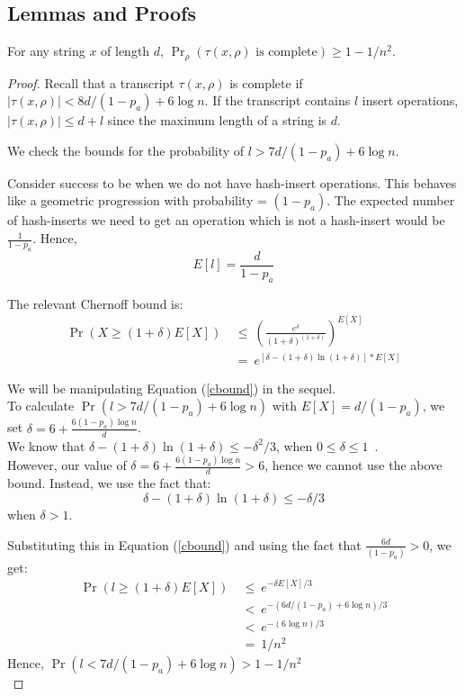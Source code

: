 \documentclass{article}
\begin{document}
\subsection*{Lemmas and Proofs}

\begin{lem}
    For any string $x$ of length $d$,
    $\Pr_\rho  (\tau(x, \rho) \text{ is complete}) \geq 1-1/n^2$.\\
    \end{lem}
    
    \begin{proof}
    
    Recall that a transcript $\tau(x, \rho)$ is complete if
    $|\tau(x, \rho)| < 8d/(1-p_a)+6\log n$.
    If the transcript contains $l$ insert operations, $|\tau(x,\rho)| \leq d+l$
    since the maximum length of a string is $d$.
    
    \noindent
    We check the bounds for the probability of $l>7d/(1-p_a)+6\log n$.
    
    Consider success to be when we do not have hash-insert operations. This
    behaves like a geometric progression with probability = $(1-p_a)$. The
    expected number of hash-inserts we need to get an operation which is not a
    hash-insert would be $\frac{1}{1-p_a}$.
    Hence,
    \[E[l] = \frac{d}{1-p_a}\]
    
    \noindent
    The relevant Chernoff bound is:
    \begin{align}
    \Pr(X \geq (1+\delta)E[X]) & ~\leq ~( \frac{e^\delta}{(1+\delta)^(1+\delta)} )^{E[X]}  \nonumber \\
    & ~= ~e^{[\delta - (1+\delta)\ln(1+\delta)]*E[X]} \label{cbound}
    \end{align}
    
    \noindent
    We will be manipulating Equation (\ref{cbound}) in the sequel. \\
    To calculate $\Pr(l > 7d/(1-p_a) + 6\log n)$ with $E[X]=d/(1-p_a)$, 
    we set $\delta = 6 + \frac{6(1-p_a)\log n}{d}$.\\
    We know that
    $\delta - (1+\delta) \ln(1+\delta) \leq -\delta ^2/3 $, when $0 \leq \delta \leq 1$~\cite{HR90}.\\
    However, our value of $\delta = 6 + \frac{6(1-p_a)\log n}{d} > 6$, hence we cannot use the above bound. Instead, we use the fact that:
    \[\delta - (1+\delta)\ln(1+\delta) \leq -\delta/3\]
    when $\delta>1$.
    
    \noindent
    Substituting this in Equation (\ref{cbound}) and using the fact that $\frac{6d}{(1-p_a)} > 0$, we get:
    \begin{align}
    \Pr(l \geq (1+\delta)E[X]) & ~\leq ~e^{-\delta E[X]/3} \nonumber \\
    & ~<~ e^{-(6d/(1-p_a)+6\log n)/3}  \nonumber \\
    & ~<~ e^{-(6\log n)/3} \nonumber \\
    & ~=~ 1/n^2 \nonumber
    \end{align}
    Hence,
    $\Pr(l < 7d/(1-p_a) + 6\log n) > 1-1/n^2$\\
    
    \end{proof}  
\end{document}

